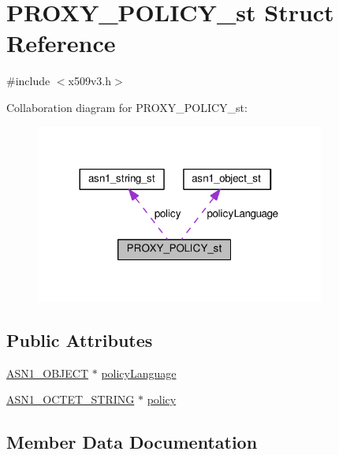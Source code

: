 \hypertarget{struct_p_r_o_x_y___p_o_l_i_c_y__st}{}\section{P\+R\+O\+X\+Y\+\_\+\+P\+O\+L\+I\+C\+Y\+\_\+st Struct Reference}
\label{struct_p_r_o_x_y___p_o_l_i_c_y__st}


{\ttfamily \#include $<$x509v3.\+h$>$}



Collaboration diagram for P\+R\+O\+X\+Y\+\_\+\+P\+O\+L\+I\+C\+Y\+\_\+st\+:
\nopagebreak
\begin{figure}[H]
\begin{center}
\leavevmode
\includegraphics[width=269pt]{struct_p_r_o_x_y___p_o_l_i_c_y__st__coll__graph}
\end{center}
\end{figure}
\subsection*{Public Attributes}
\begin{DoxyCompactItemize}
\item 
\hyperlink{asn1_8h_ae10c08e4e6b23f67a39b2add932ec48f}{A\+S\+N1\+\_\+\+O\+B\+J\+E\+CT} $\ast$ \hyperlink{struct_p_r_o_x_y___p_o_l_i_c_y__st_ab3fa64c1bd1d75d3433ec2c57ad2c764}{policy\+Language}
\item 
\hyperlink{ossl__typ_8h_afbd05e94e0f0430a2b729473efec88c1}{A\+S\+N1\+\_\+\+O\+C\+T\+E\+T\+\_\+\+S\+T\+R\+I\+NG} $\ast$ \hyperlink{struct_p_r_o_x_y___p_o_l_i_c_y__st_ac3360dfde3677ca63163277535db0dc2}{policy}
\end{DoxyCompactItemize}


\subsection{Member Data Documentation}
